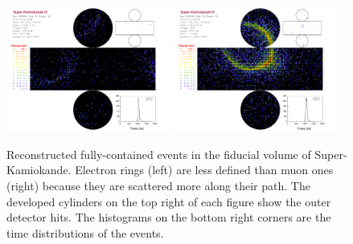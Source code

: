 \begin{figure}
	\centering
	\includegraphics[width=0.48\textwidth]{pics/Electron.pdf}
	\hfill
	\includegraphics[width=0.48\textwidth]{pics/Muon.pdf}
	\caption[Reconstructed fully-contained events in Super-Kamiokande]%
	{Reconstructed fully-contained events in the fiducial volume of Super-Kamiokande.
	Electron rings (left) are less defined than muon ones (right) because they are scattered more %
	along their path.
	The developed cylinders on the top right of each figure show the outer detector hits.
	The histograms on the bottom right corners are the time distributions of the events.}
	\label{fig:sk_events}
\end{figure}

